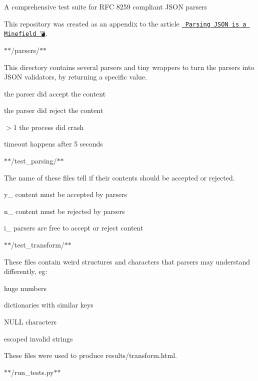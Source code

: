 A comprehensive test suite for R\+FC 8259 compliant J\+S\+ON parsers

This repository was created as an appendix to the article \href{http://seriot.ch/parsing_json.php}{\texttt{ Parsing J\+S\+ON is a Minefield 💣}}.

$\ast$$\ast$/parsers/$\ast$$\ast$

This directory contains several parsers and tiny wrappers to turn the parsers into J\+S\+ON validators, by returning a specific value.


\begin{DoxyItemize}
\item {} the parser did accept the content
\item {} the parser did reject the content
\item {\ttfamily $>$1} the process did crash
\item {\ttfamily timeout} happens after 5 seconds
\end{DoxyItemize}

$\ast$$\ast$/test\+\_\+parsing/$\ast$$\ast$

The name of these files tell if their contents should be accepted or rejected.


\begin{DoxyItemize}
\item {\ttfamily y\+\_\+} content must be accepted by parsers
\item {\ttfamily n\+\_\+} content must be rejected by parsers
\item {\ttfamily i\+\_\+} parsers are free to accept or reject content
\end{DoxyItemize}

$\ast$$\ast$/test\+\_\+transform/$\ast$$\ast$

These files contain weird structures and characters that parsers may understand differently, eg\+:


\begin{DoxyItemize}
\item huge numbers
\item dictionaries with similar keys
\item N\+U\+LL characters
\item escaped invalid strings
\end{DoxyItemize}

These files were used to produce {\ttfamily results/transform.\+html}.

$\ast$$\ast$/run\+\_\+tests.py$\ast$$\ast$

